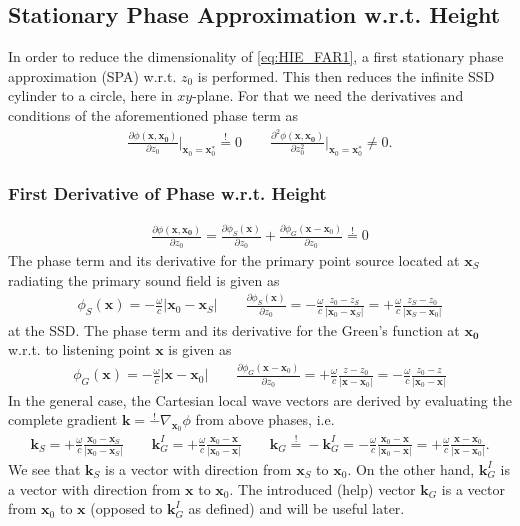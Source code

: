 \documentclass[a4paper,BCOR=15mm,10pt,twoside]{scrartcl}
\newcommand\wc{\frac{\omega}{c}}  %
\renewcommand{\vec}[1]{\mathbf{#1}}  %
\begin{document}
\subsection{Stationary Phase Approximation w.r.t. Height}
In order to reduce the dimensionality of \eqref{eq:HIE_FAR1}, a first stationary phase approximation (SPA) w.r.t. $z_0$ is performed.
This then reduces the infinite SSD cylinder to a circle, here in $xy$-plane.
For that we need the derivatives and conditions of the aforementioned phase term as
%
\begin{align}
\frac{\partial \phi(\vec{x}, \vec{x_0})}{\partial z_0}\bigg|_{\vec{x}_0=\vec{x}_0^*} \stackrel{!}{=} 0 \qquad
\frac{\partial^2 \phi(\vec{x}, \vec{x_0})}{\partial z_0^2}\bigg|_{\vec{x}_0=\vec{x}_0^*} \neq 0.
\end{align}
%
\subsubsection{First Derivative of Phase w.r.t. Height}
%
\begin{align}
\label{eq:PhaseSGDer1Condition}
\frac{\partial \phi(\vec{x}, \vec{x_0})}{\partial z_0} = \frac{\partial \phi_{S}(\vec{x})}{\partial z_0}   + \frac{\partial \phi_{G}(\vec{x}-\vec{x}_0)}{\partial z_0} \stackrel{!}{=} 0
\end{align}
%
The phase term and its derivative for the primary point source located at $\vec{x}_S$ radiating the primary sound field is given as
\begin{align}
\label{eq:phaseS}
\phi_{S}(\vec{x}) = -\wc |\vec{x}_0-\vec{x}_S|\qquad \frac{\partial \phi_{S}(\vec{x})}{\partial z_0} = - \wc \frac{z_0-z_S}{|\vec{x}_0-\vec{x}_S|} = + \wc \frac{z_S-z_0}{|\vec{x}_S-\vec{x}_0|}
\end{align}
at the SSD.
The phase term and its derivative for the Green's function at $\vec{x_0}$ w.r.t. to listening point $\vec{x}$ is given as
\begin{align}
\label{eq:phaseG}
\phi_{G}(\vec{x}) = -\wc |\vec{x}-\vec{x}_0| \qquad \frac{\partial \phi_{G}(\vec{x}-\vec{x}_0)}{\partial z_0} = +\wc \frac{z-z_0}{|\vec{x}-\vec{x}_0|} = -\wc \frac{z_0-z}{|\vec{x}_0-\vec{x}|}
\end{align}
In the general case, the Cartesian local wave vectors are derived by evaluating the complete gradient $\vec{k} = \stackrel{!}{-} \nabla_{\vec{x}_0} \phi$ from above phases, i.e.
\begin{align}
\label{eq:WaveVectorsSPA1}
\vec{k}_S = + \wc \frac{\vec{x}_0-\vec{x}_S}{|\vec{x}_0-\vec{x}_S|}
\qquad \vec{k}_G^I = + \wc \frac{\vec{x}_0-\vec{x}}{|\vec{x}_0-\vec{x}|}
\qquad \vec{k}_G \stackrel{!}{=} - \vec{k}_G^I = - \wc \frac{\vec{x}_0-\vec{x}}{|\vec{x}_0-\vec{x}|} = + \wc \frac{\vec{x}-\vec{x}_0}{|\vec{x}-\vec{x}_0|}.
\end{align}
We see that $\vec{k}_S $ is a vector with direction from $\vec{x}_S$ to $\vec{x}_0$. On the other hand, $\vec{k}_G^I$ is a vector with direction from $\vec{x}$ to $\vec{x}_0$. The introduced (help) vector 
$\vec{k}_G$ is a vector from $\vec{x}_0$ to $\vec{x}$ (opposed to $\vec{k}_G^I $ as defined) and will be useful later.
\end{document}
